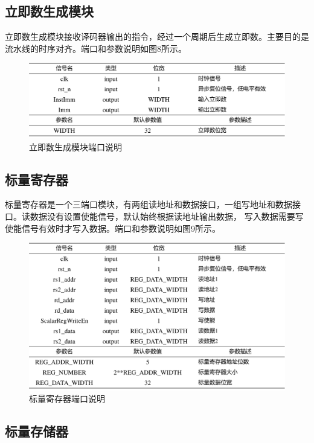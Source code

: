 \documentclass[UTF8]{ctexart}
\begin{document}
\subsection{立即数生成模块}

立即数生成模块接收译码器输出的指令，经过一个周期后生成立即数。主要目的是流水线的时序对齐。端口和参数说明如图8所示。

\begin{figure}[htbp]
    \centering
    \includegraphics[width=16cm]{pic/Immgen.png}
    \caption{立即数生成模块端口说明}
\end{figure}

\subsection{标量寄存器}
标量寄存器是一个三端口模块，有两组读地址和数据接口，一组写地址和数据接口。读数据没有设置使能信号，默认始终根据读地址输出数据，
写入数据需要写使能信号有效时才写入数据。端口和参数说明如图9所示。

\begin{figure}[htbp]
    \centering
    \includegraphics[width=16cm]{pic/ScalarRF.png}
    \caption{标量寄存器端口说明}
\end{figure}

\subsection{标量存储器}
\end{document}
